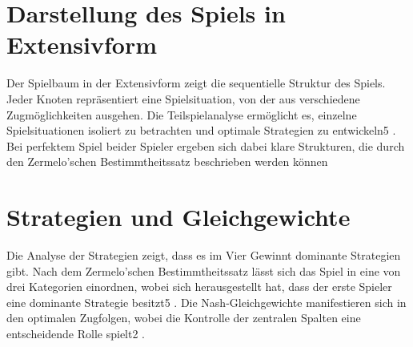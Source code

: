  \section{Darstellung des Spiels in Extensivform}
%
%

Der Spielbaum in der Extensivform zeigt die sequentielle Struktur des Spiels. Jeder Knoten repräsentiert eine Spielsituation, von der aus verschiedene Zugmöglichkeiten ausgehen. Die Teilspielanalyse ermöglicht es, einzelne Spielsituationen isoliert zu betrachten und optimale Strategien zu entwickeln5
. Bei perfektem Spiel beider Spieler ergeben sich dabei klare Strukturen, die durch den Zermelo'schen Bestimmtheitssatz beschrieben werden können

\section{Strategien und Gleichgewichte}
Die Analyse der Strategien zeigt, dass es im Vier Gewinnt dominante Strategien gibt. Nach dem Zermelo'schen Bestimmtheitssatz lässt sich das Spiel in eine von drei Kategorien einordnen, wobei sich herausgestellt hat, dass der erste Spieler eine dominante Strategie besitzt5
. Die Nash-Gleichgewichte manifestieren sich in den optimalen Zugfolgen, wobei die Kontrolle der zentralen Spalten eine entscheidende Rolle spielt2
.

